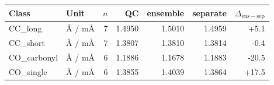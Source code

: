 \begin{tabular}{llrrrrr}
\toprule
Class & Unit & $n$ & QC & ensemble & separate & $\Delta_\mathrm{ens-sep}$ \\
\midrule
CC\_long & \AA{} / m\AA & 7 & 1.4950 & 1.5010 & 1.4959 & +5.1 \\
CC\_short & \AA{} / m\AA & 7 & 1.3807 & 1.3810 & 1.3814 & -0.4 \\
CO\_carbonyl & \AA{} / m\AA & 6 & 1.1886 & 1.1678 & 1.1883 & -20.5 \\
CO\_single & \AA{} / m\AA & 6 & 1.3855 & 1.4039 & 1.3864 & +17.5 \\
\bottomrule
\end{tabular}
